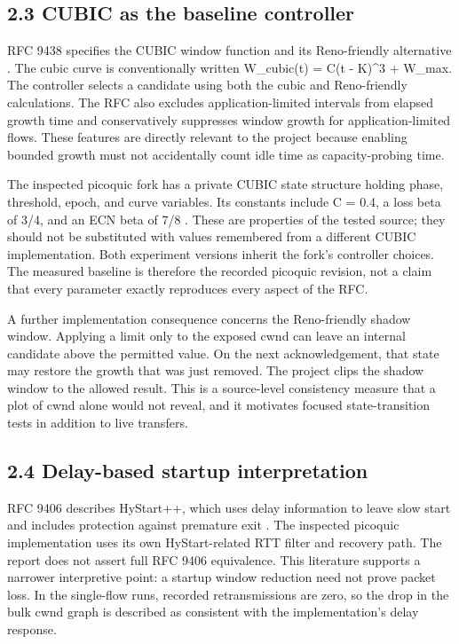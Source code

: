 \subsection*{2.3 CUBIC as the baseline controller}

RFC 9438 specifies the CUBIC window function and its Reno-friendly alternative \cite{ref2}. The cubic curve is conventionally written W\_cubic(t) = C(t - K)\textasciicircum{}3 + W\_max. The controller selects a candidate using both the cubic and Reno-friendly calculations. The RFC also excludes application-limited intervals from elapsed growth time and conservatively suppresses window growth for application-limited flows. These features are directly relevant to the project because enabling bounded growth must not accidentally count idle time as capacity-probing time.


The inspected picoquic fork has a private CUBIC state structure holding phase, threshold, epoch, and curve variables. Its constants include C = 0.4, a loss beta of 3/4, and an ECN beta of 7/8 \cite{ref12}. These are properties of the tested source; they should not be substituted with values remembered from a different CUBIC implementation. Both experiment versions inherit the fork's controller choices. The measured baseline is therefore the recorded picoquic revision, not a claim that every parameter exactly reproduces every aspect of the RFC.


A further implementation consequence concerns the Reno-friendly shadow window. Applying a limit only to the exposed cwnd can leave an internal candidate above the permitted value. On the next acknowledgement, that state may restore the growth that was just removed. The project clips the shadow window to the allowed result. This is a source-level consistency measure that a plot of cwnd alone would not reveal, and it motivates focused state-transition tests in addition to live transfers.


\subsection*{2.4 Delay-based startup interpretation}

RFC 9406 describes HyStart++, which uses delay information to leave slow start and includes protection against premature exit \cite{ref7}. The inspected picoquic implementation uses its own HyStart-related RTT filter and recovery path. The report does not assert full RFC 9406 equivalence. This literature supports a narrower interpretive point: a startup window reduction need not prove packet loss. In the single-flow runs, recorded retransmissions are zero, so the drop in the bulk cwnd graph is described as consistent with the implementation's delay response.


